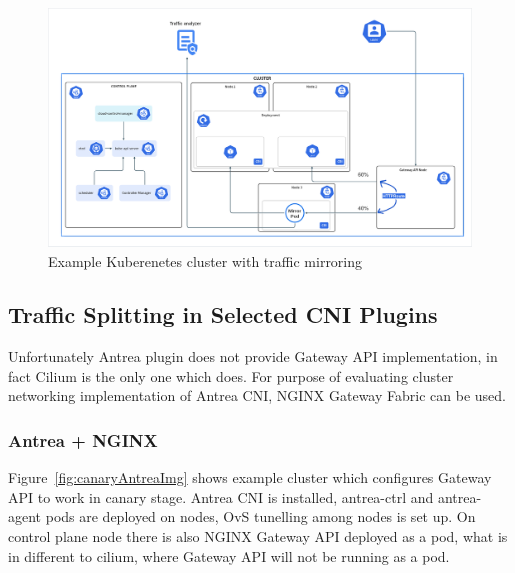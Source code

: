 \begin{figure}[H]
    \centering
    \includegraphics[width=1\columnwidth]{images/ingress.png}
    \caption{Example Kuberenetes cluster with traffic mirroring}
    \label{fig:mirroringImg}
\end{figure}


\subsection{Traffic Splitting in Selected CNI Plugins}
\label{subsection:trafficSplitting}

Unfortunately Antrea plugin does not provide Gateway API implementation, in fact Cilium is the only one which does. For purpose of evaluating cluster networking implementation of Antrea CNI, NGINX Gateway Fabric can be used.



\subsubsection{Antrea + NGINX}
\label{subsection:antreaIngress}

Figure~\ref{fig:canaryAntreaImg} shows example cluster which configures Gateway API to work in canary stage. Antrea CNI is installed, antrea-ctrl and antrea-agent pods are deployed on nodes, OvS tunelling among nodes is set up. On control plane node there is also NGINX Gateway API deployed as a pod, what is in different to cilium, where Gateway API will not be running as a pod.

